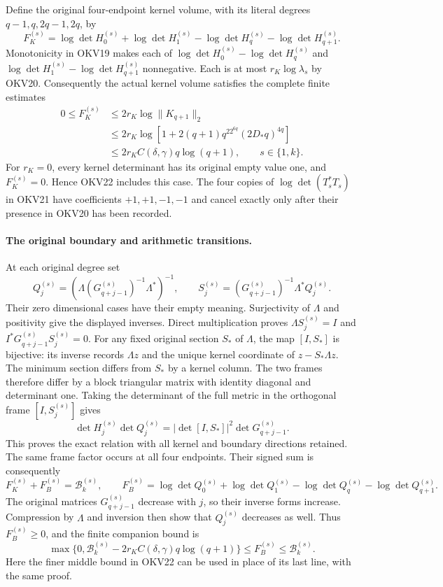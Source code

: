 \documentclass[11pt,a4paper]{article}
\begin{document}
Define the original four-endpoint kernel volume, with its literal
degrees $q-1,q,2q-1,2q$, by
\[
 F_K^{(s)}=
 \log\det H_0^{(s)}+\log\det H_1^{(s)}
       -\log\det H_q^{(s)}-\log\det H_{q+1}^{(s)}.
 \tag{OKV21}
\]
Monotonicity in OKV19 makes each of
$\log\det H_0^{(s)}-\log\det H_q^{(s)}$ and
$\log\det H_1^{(s)}-\log\det H_{q+1}^{(s)}$ nonnegative.
Each is at most $r_K\log\lambda_s$ by OKV20. Consequently the
actual kernel volume satisfies the complete finite estimates
\[
 \boxed{\begin{split}
 0\le F_K^{(s)}
 &\le2r_K\log\|K_{q+1}\|_2\\
 &\le2r_K\log\left[1+2(q+1)q^22^{6q}(2D_*q)^{4q}\right]\\
 &\le2r_K C(\delta,\gamma)q\log(q+1),
                    \qquad s\in\{1,k\}.
 \end{split}}
 \tag{OKV22}
\]
For $r_K=0$, every kernel determinant has its original empty value
one, and $F_K^{(s)}=0$. Hence OKV22 includes this case.
The four copies of $\log\det(T_s^*T_s)$ in OKV21 have coefficients
$+1,+1,-1,-1$ and cancel exactly only after their presence in
OKV20 has been recorded.

\paragraph{The original boundary and arithmetic transitions.}
At each original degree set
\[
 Q_j^{(s)}=
   \left(\Lambda (G_{q+j-1}^{(s)})^{-1}\Lambda^*\right)^{-1},
 \qquad
 S_j^{(s)}=(G_{q+j-1}^{(s)})^{-1}\Lambda^*Q_j^{(s)}.
 \tag{OKV23}
\]
Their zero dimensional cases have their empty meaning. Surjectivity
of $\Lambda$ and positivity give the displayed inverses. Direct
multiplication proves $\Lambda S_j^{(s)}=I$ and
$I^*G_{q+j-1}^{(s)}S_j^{(s)}=0$.
For any fixed original section $S_*$ of $\Lambda$, the map $[I,S_*]$
is bijective: its inverse records $\Lambda z$ and the unique kernel
coordinate of $z-S_*\Lambda z$. The minimum section differs from
$S_*$ by a kernel column. The two frames therefore differ by a
block triangular matrix with identity diagonal and determinant one.
Taking the determinant of the full metric in the orthogonal frame
$[I,S_j^{(s)}]$ gives
\[
 \det H_j^{(s)}\det Q_j^{(s)}
       =|\det[I,S_*]|^2\det G_{q+j-1}^{(s)}.
 \tag{OKV24}
\]
This proves the exact relation with all kernel and boundary directions
retained. The same frame factor occurs at all four endpoints.
Their signed sum is consequently
\[
 F_K^{(s)}+F_B^{(s)}=\mathcal B_k^{(s)},\qquad
 F_B^{(s)}=\log\det Q_0^{(s)}+\log\det Q_1^{(s)}
               -\log\det Q_q^{(s)}-\log\det Q_{q+1}^{(s)}.
 \tag{OKV25}
\]
The original matrices $G_{q+j-1}^{(s)}$ decrease with $j$, so their
inverse forms increase. Compression by $\Lambda$ and inversion then
show that $Q_j^{(s)}$ decreases as well. Thus $F_B^{(s)}\ge0$,
and the finite companion bound is
\[
 \max\{0,\mathcal B_k^{(s)}-2r_K C(\delta,\gamma)q\log(q+1)\}
       \le F_B^{(s)}\le\mathcal B_k^{(s)}.
 \tag{OKV26}
\]
Here the finer middle bound in OKV22 can be used in place of its
last line, with the same proof.
\end{document}
